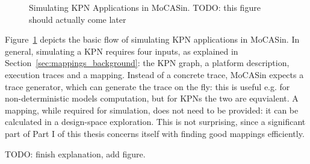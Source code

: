 \begin{figure}[h]
	\centering
   \resizebox{0.95\textwidth}{!}{}
	\caption{Simulating KPN Applications in MoCASin. TODO: this figure should actually come later}
	\label{fig:mocasin_kpn_simulation}
\end{figure}

Figure~\ref{fig:mocasin_kpn_simulation} depicts the basic flow of simulating KPN applications in MoCASin. In general, simulating a KPN requires four inputs, as explained in Section~\ref{sec:mappings_background}: the KPN graph, a platform description, execution traces and a mapping. Instead of a concrete trace, MoCASin expects a trace generator, which can generate the trace on the fly: this is useful e.g. for non-deterministic models computation, but for KPNs the two are equvialent. A mapping, while required for simulation, does not need to be provided: it can be calculated in a design-space exploration. This is not surprising, since a significant part of Part I of this thesis concerns itself with finding good mappings efficiently.

TODO: finish explanation, add figure.